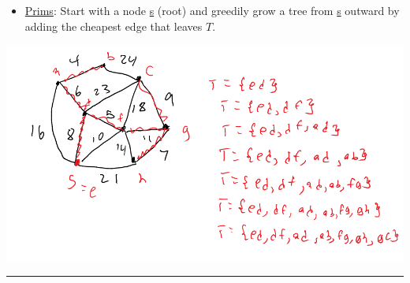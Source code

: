 \documentclass[11pt]{article}
\begin{document}
\begin{itemize}
\item \uline{Prims}: Start with a node \uline{s} (root) and greedily grow a tree from \uline{s} outward by adding the cheapest edge that leaves \(T\).
\end{itemize}
\begin{center}
\includegraphics[width=.9\linewidth]{./Images/i46.png}
\end{center}

\noindent\rule{\textwidth}{0.5pt}
\end{document}
